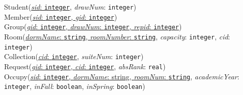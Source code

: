 \documentclass{article}
\begin{document}
\noindent Student(\underline{\textit{sid}: \texttt{integer}}, \textit{drawNum}: \texttt{integer}) \\
\noindent Member(\underline{\textit{sid}: \texttt{integer}, \textit{gid}: \texttt{integer}}) \\
\noindent Group(\underline{\textit{gid}: \texttt{integer}, \textit{drawNum}: \texttt{integer}, \textit{repid}: \texttt{integer}})\\

\noindent Room(\underline{\textit{dormName}: \texttt{string}, \textit{roomNumber}: \texttt{string}}, \textit{capacity}: \texttt{integer}, \textit{cid}: \texttt{integer}) \\
\noindent Collection(\underline{\textit{cid}: \texttt{integer}}, \textit{suiteNum}: \texttt{integer})\\

\noindent Request(\underline{\textit{gid}: \texttt{integer}, \textit{cid}: \texttt{integer}}, \textit{absRank}: \texttt{real}) \\
\noindent Occupy(\underline{\textit{sid}: \texttt{integer}, \textit{dormName}: string, \textit{roomNum}: \texttt{string}}, \textit{academicYear}: \texttt{integer}, \textit{inFall}: \texttt{boolean}, \textit{inSpring}: \texttt{boolean}) \\
\end{document}

